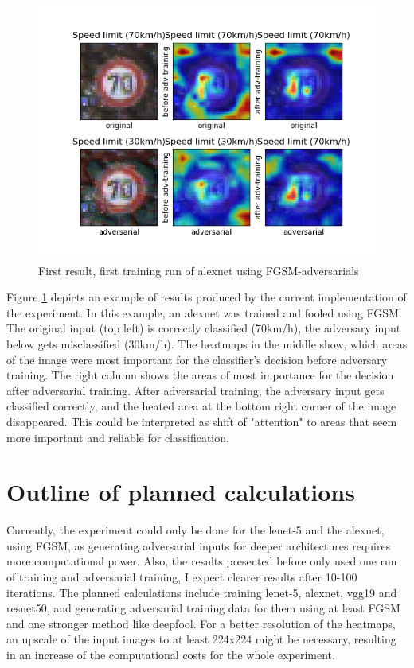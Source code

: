 \documentclass[draft,final]{vutinfth} %
\begin{document}
\begin{figure}[h]
    \centering
    \includegraphics[scale=0.5]{graphics/Results/3.png}
    \caption{First result, first training run of alexnet using FGSM-adversarials}
    \label{fig:results} %
\end{figure}

Figure \ref{fig:results} depicts an example of results produced by the current implementation of the experiment. In this example, an alexnet was trained and fooled using FGSM. The original input (top left) is correctly classified (70km/h), the adversary input below gets misclassified (30km/h). The heatmaps in the middle show, which areas of the image were most important for the classifier's decision before adversary training. The right column shows the areas of most importance for the decision after adversarial training. After adversarial training, the adversary input gets classified correctly, and the heated area at the bottom right corner of the image disappeared. This could be interpreted as shift of "attention" to areas that seem more important and reliable for classification.

\chapter{Outline of planned calculations}

Currently, the experiment could only be done for the lenet-5 and the alexnet, using FGSM, as generating adversarial inputs for deeper architectures requires more computational power. Also, the results presented before only used one run of training and adversarial training, I expect clearer results after 10-100 iterations.
The planned calculations include training lenet-5, alexnet, vgg19 and resnet50, and generating adversarial training data for them using at least FGSM and one stronger method like deepfool. For a better resolution of the heatmaps, an upscale of the input images to at least 224x224 might be necessary, resulting in an increase of the computational costs for the whole experiment.
\end{document}
